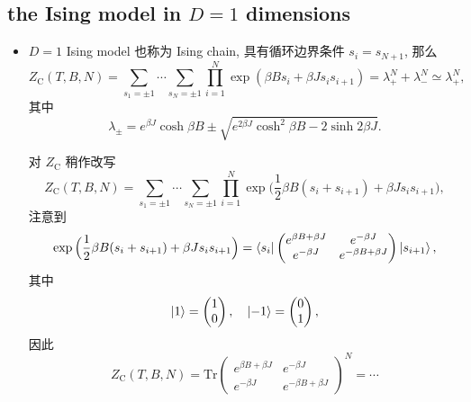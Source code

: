 \subsection{the Ising model in \texorpdfstring{$D = 1$}{D=1} dimensions}
\begin{itemize}
	\item $D = 1$ Ising model 也称为 Ising chain, 具有循环边界条件 $s_i = s_{N + 1}$, 那么
	\begin{equation} \label{11.4.1}
		Z_\text{C}(T, B, N) = \sum_{s_1 = \pm 1} \cdots \sum_{s_N = \pm 1} \prod_{i = 1}^N \exp(\beta B s_i + \beta J s_i s_{i + 1}) = \lambda_+^N + \lambda_-^N \simeq \lambda_+^N,
	\end{equation}
	其中
	\begin{equation}
		\lambda_\pm = e^{\beta J} \cosh \beta B \pm \sqrt{e^{2 \beta J} \cosh^2 \beta B - 2 \sinh 2 \beta J}.
	\end{equation}
	
	\begin{tcolorbox}[title=calculation:]
		对 $Z_\text{C}$ 稍作改写
		\begin{equation}
			Z_\text{C}(T, B, N) = \sum_{s_1 = \pm 1} \cdots \sum_{s_N = \pm 1} \prod_{i = 1}^N \exp \Big( \frac{1}{2} \beta B (s_i + s_{i + 1}) + \beta J s_i s_{i + 1} \Big),
		\end{equation}
		注意到
		\begin{equation}
			\exp \Big( \frac{1}{2} \beta B (s_i + s_{i + 1}) + \beta J s_i s_{i + 1} \Big) = \braket{s_i | \begin{pmatrix}
				e^{\beta B + \beta J} & e^{- \beta J} \\
				e^{- \beta J} & e^{- \beta B + \beta J}
			\end{pmatrix} | s_{i + 1}},
		\end{equation}
		其中
		\begin{equation}
			\ket{1} = \begin{pmatrix}
				1 \\
				0
			\end{pmatrix}, \quad \ket{- 1} = \begin{pmatrix}
				0 \\
				1
			\end{pmatrix},
		\end{equation}
		因此
		\begin{equation}
			Z_\text{C}(T, B, N) = \mathrm{Tr} \begin{pmatrix}
				e^{\beta B + \beta J} & e^{- \beta J} \\
				e^{- \beta J} & e^{- \beta B + \beta J}
			\end{pmatrix}^N = \cdots
		\end{equation}
	\end{tcolorbox}
	

\end{itemize}
